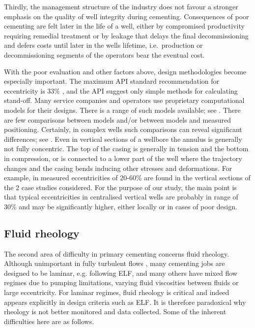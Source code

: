 \documentclass[review]{elsarticle}
\begin{document}
Thirdly, the management structure of the industry does not favour a stronger emphasis on the quality of well integrity during cementing. Consequences of poor cementing are felt later in the life of a well, either by compromised productivity requiring remedial treatment or by leakage that delays the final decommissioning and defers costs until later in the wells lifetime, i.e.~production or decommissioning segments of the operators bear the eventual cost.

With the poor evaluation and other factors above, design methodologies become especially important.
The maximum API standard recommendation for eccentricity is 33\% \citep{bottiglieri2014}, and the API suggest only simple methods for calculating stand-off. Many service companies and operators use proprietary computational models for their designs. There is a range of such models available; see \cite{juvkam1992,blanco2000,Guillot2008}. There are few comparisons between models and/or between models and measured positioning. Certainly, in complex wells such comparisons can reveal significant differences; see \citep{Gorokhova2014}. Even in vertical sections of a wellbore the annulus is generally not fully concentric. The top of the casing is generally in tension and the bottom in compression, or is connected to a lower part of the well where the trajectory changes and the casing bends inducing other stresses and deformations. For example, in \citet{Guillot2008} measured eccentricities of 20-60\% are found in the vertical sections of the 2 case studies considered. For the purpose of our study, the main point is that typical eccentricities in centralised vertical wells are probably in range of 30\% and may be significantly higher, either locally or in cases of poor  design.

\subsection{Fluid rheology}

The second area of difficulty in primary cementing concerns fluid rheology. Although unimportant in fully turbulent flows \citep{Maleki2018b}, many cementing jobs are designed to be laminar, e.g. following ELF, and many others have mixed flow regimes due to pumping limitations, varying fluid viscosities between fluids or large eccentricity. For laminar regimes, fluid rheology is critical and indeed appears explicitly in design criteria such as ELF. It is therefore paradoxical why rheology is not better monitored and data collected. Some of the inherent difficulties here are as follows.
\end{document}
